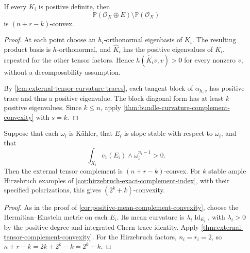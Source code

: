 \begin{theorem}\label{thm:external-tensor-complement-convexity}
If every $K_i$ is positive definite, then
\[
 \mathbb P(\mathcal O_X\oplus E)\setminus\mathbb P(\mathcal O_X)
\]
is $(n+r-k)$-convex.
\end{theorem}
\begin{proof}
At each point choose an $h_i$-orthonormal eigenbasis of $K_i$. The resulting product basis is $h$-orthonormal, and $\widehat K_i$ has the positive eigenvalues of $K_i$, repeated for the other tensor factors. Hence $h(\widehat K_i v,v)>0$ for every nonzero $v$, without a decomposability assumption.

By \cref{lem:external-tensor-curvature-traces}, each tangent block of $\alpha_{h,v}$ has positive trace and thus a positive eigenvalue. The block diagonal form has at least $k$ positive eigenvalues. Since $k\leq n$, apply \cref{thm:bundle-curvature-complement-convexity} with $s=k$.
\end{proof}

\begin{corollary}\label{cor:stable-factor-complement-convexity}
Suppose that each $\omega_i$ is K\"ahler, that $E_i$ is slope-stable with respect to $\omega_i$, and that
\[
 \int_{X_i}c_1(E_i)\wedge\omega_i^{n_i-1}>0.
\]
Then the external tensor complement is $(n+r-k)$-convex. For $k$ stable ample Hirzebruch examples of \cref{cor:hirzebruch-exact-complement-index}, with their specified polarizations, this gives $(2^k+k)$-convexity.
\end{corollary}
\begin{proof}
As in the proof of \cref{cor:positive-mean-complement-convexity}, choose the Hermitian--Einstein metric on each $E_i$. Its mean curvature is $\lambda_i\operatorname{Id}_{E_i}$, with $\lambda_i>0$ by the positive degree and integrated Chern trace identity. Apply \cref{thm:external-tensor-complement-convexity}. For the Hirzebruch factors, $n_i=r_i=2$, so $n+r-k=2k+2^k-k=2^k+k$.
\end{proof}
